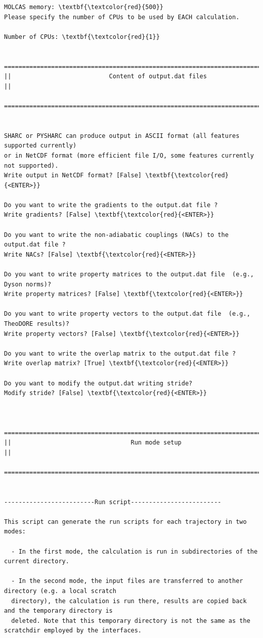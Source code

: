 \documentclass[a4paper,11pt,DIV=15,openany]{scrbook}
\begin{document}
\begin{oframed}
\begin{Verbatim}[commandchars=\\\{\}]
MOLCAS memory: \textbf{\textcolor{red}{500}}
Please specify the number of CPUs to be used by EACH calculation.

Number of CPUs: \textbf{\textcolor{red}{1}}

  ================================================================================
||                           Content of output.dat files                          ||
  ================================================================================


SHARC or PYSHARC can produce output in ASCII format (all features supported currently)
or in NetCDF format (more efficient file I/O, some features currently not supported).
Write output in NetCDF format? [False] \textbf{\textcolor{red}{<ENTER>}}

Do you want to write the gradients to the output.dat file ?
Write gradients? [False] \textbf{\textcolor{red}{<ENTER>}}

Do you want to write the non-adiabatic couplings (NACs) to the output.dat file ?
Write NACs? [False] \textbf{\textcolor{red}{<ENTER>}}

Do you want to write property matrices to the output.dat file  (e.g., Dyson norms)?
Write property matrices? [False] \textbf{\textcolor{red}{<ENTER>}}

Do you want to write property vectors to the output.dat file  (e.g., TheoDORE results)?
Write property vectors? [False] \textbf{\textcolor{red}{<ENTER>}}

Do you want to write the overlap matrix to the output.dat file ?
Write overlap matrix? [True] \textbf{\textcolor{red}{<ENTER>}}

Do you want to modify the output.dat writing stride?
Modify stride? [False] \textbf{\textcolor{red}{<ENTER>}}


  ================================================================================
||                                 Run mode setup                                 ||
  ================================================================================


-------------------------Run script-------------------------

This script can generate the run scripts for each trajectory in two modes:

  - In the first mode, the calculation is run in subdirectories of the current directory.

  - In the second mode, the input files are transferred to another directory (e.g. a local scratch 
  directory), the calculation is run there, results are copied back and the temporary directory is 
  deleted. Note that this temporary directory is not the same as the scratchdir employed by the interfaces.


\end{Verbatim}
\end{oframed}
\end{document}
